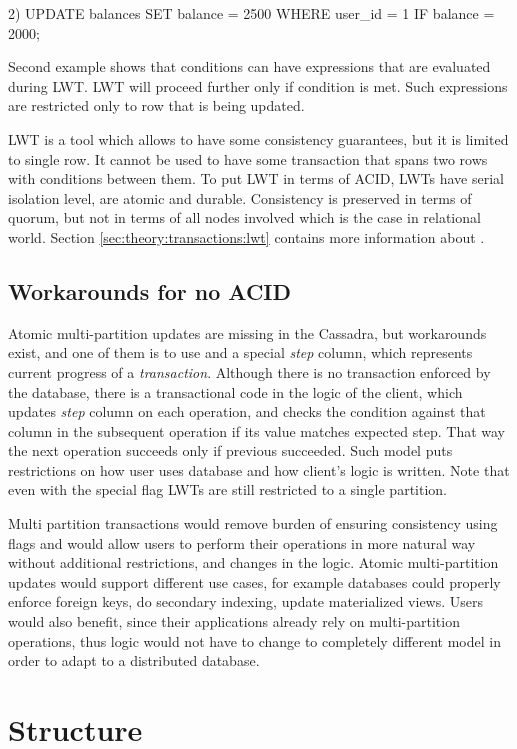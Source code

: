 2)
UPDATE balances SET balance = 2500 WHERE user_id = 1 IF balance = 2000;

Second example shows that conditions can have expressions that are evaluated during LWT. LWT will proceed further only if condition is met. Such expressions are restricted only to row that is being updated.

LWT is a tool which allows to have some consistency guarantees, but it is limited to single row. It cannot be used to have some transaction that spans two rows with conditions between them. 
To put LWT in terms of ACID, LWTs have serial isolation level, are atomic and durable. Consistency is preserved in terms of quorum, but not in terms of all nodes involved which is the case in relational world. Section \ref{sec:theory:transactions:lwt} contains more information about \lwt.

\subsection{Workarounds for no ACID}
Atomic multi-partition updates are missing in the Cassadra, but workarounds exist, and one of them is to use \lwt and a special \emph{step} column, which represents current progress of a \emph{transaction}. Although there is no transaction enforced by the database, there is a transactional code in the logic of the client, which updates \emph{step} column on each operation, and checks the condition against that column in the subsequent operation if its value matches expected step. That way the next operation succeeds only if previous succeeded. Such model puts restrictions on how user uses database and how client's logic is written. Note that even with the special flag LWTs are still restricted to a single partition.  

Multi partition transactions would remove burden of ensuring consistency using flags and would allow users to perform their operations in more natural way without additional restrictions, and changes in the logic. 
Atomic multi-partition updates would support different use cases, for example databases could properly enforce foreign keys, do secondary indexing, update materialized views. Users would also benefit, since their applications already rely on multi-partition operations, thus logic would not have to change to completely different model in order to adapt to a distributed database. 
\section{Structure}\label{sec:introduction:structure}

